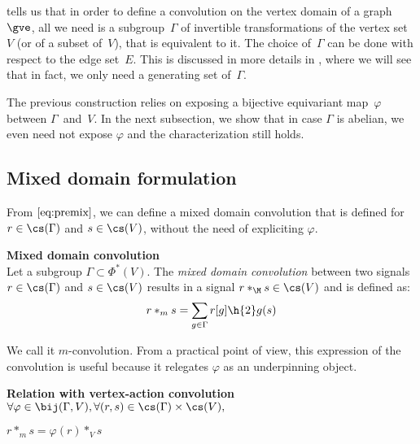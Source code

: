  tells us that in order to define a convolution on the vertex domain of a graph $\gve$, all we need is a subgroup~$\Gamma$ of invertible transformations of the vertex set~$V$ (or of a subset of~$V$), that is equivalent to it. The choice of~$\Gamma$ can be done with respect to the edge set~$E$. This is discussed in more details in , where we will see that in fact, we only need a generating set of~$\Gamma$.

The previous construction relies on exposing a bijective equivariant map~$\varphi$ between $\Gamma$~and~$V$. In the next subsection, we show that in case $\Gamma$ is abelian, we even need not expose $\varphi$ and the characterization still holds.

\subsection{Mixed domain formulation}

From $\eqref{eq:premix}$, we can define a mixed domain convolution \ie that is defined for $r \in \cs(\Gamma)$ and $s \in \cs(V)$, without the need of expliciting $\varphi$.

\begin{definition}\textbf{Mixed domain convolution}\\
Let a subgroup $\Gamma \subset \Phi^*(V)$.
The \emph{mixed domain convolution} between two signals $r \in \cs(\Gamma)$ and $s \in \cs(V)$ results in a signal $r \ast_{\M} s \in \cs(V)$ and is defined as:
\begin{gather*}
r \ast_m s = \displaystyle \sum_{g \in \Gamma} r[g] \h{2} g(s)
\end{gather*}
\label{def:convm}
\end{definition}

We call it $m$-convolution. From a practical point of view, this expression of the convolution is useful because it relegates $\varphi$ as an underpinning object.%

\begin{lemma}\textbf{Relation with vertex-action convolution}\\
$\forall \varphi \in \bij(\Gamma, V), \forall (r,s) \in \cs(\Gamma) \times \cs(V),$\\
\centerline{$r \ast_m s = \varphi(r) \ast_{V} s$}
\label{lem:rel3m}
\end{lemma}

